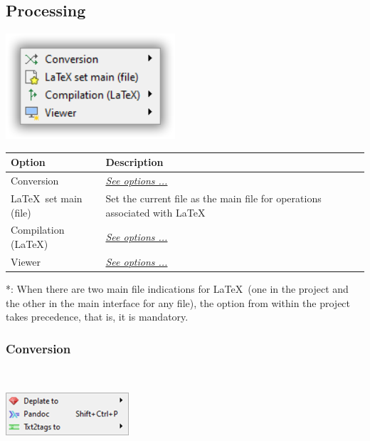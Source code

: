 \subsection{Processing}

\includegraphics[scale=0.50]{./res/menu_tools_processing.png}\\

\begin{scriptsize}
  \begin{tabularx}{\textwidth}{>{\hsize=0.3\hsize}X>{\hsize=0.7\hsize}X}\\
    \hline
    \textbf{Option} & \textbf{Description} \\
    \hline
    Conversion & \textit{\href{\#menu\_tools\_processing\_conversion}{See options ...}} \\
    \LaTeX ~set main (file) & Set the current file as the main file for operations associated with \LaTeX* \\
    Compilation (\LaTeX) & \textit{\href{\#menu\_tools\_processing\_conversion\_compilation}{See options ...}} \\
    Viewer & \textit{\href{\#menu\_tools\_processing\_viewer}{See options ...}} \\
    \hline
  \end{tabularx}
\end{scriptsize}
*: When there are two main file indications for \LaTeX ~(one in the project and the other in the main
interface for any file), the option from within the project takes precedence, that is, it is mandatory.

\newpage
\hypertarget{menu_tools_processing_conversion}{}
\subsubsection{Conversion}\\

\includegraphics[scale=0.50]{./res/menu_tools_processing_conversion.png}\\

